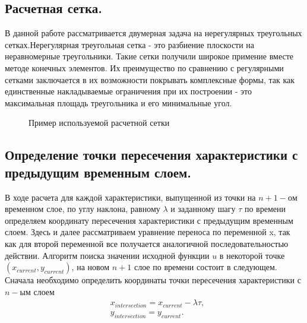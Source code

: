 \documentclass[14pt]{article}
\begin{document}
\subsection{Расчетная сетка.}
 В данной работе рассматривается двумерная задача на нерегулярных треугольных сетках.Нерегулярная треугольная сетка - это разбиение плоскости на неравномерные треугольники. Такие сетки получили широкое примение вместе методе конечных элементов. Их преимущество по сравнению с регулярными сетками заключается в их возможности покрывать комплексные формы, так как единственные накладываемые ограничения при их построении - это максимальная площадь треугольника и его минимальные угол.
\begin{figure}[!h]
\caption{Пример используемой расчетной сетки}
\end{figure}
\subsection{Определение точки пересечения характеристики с предыдущим временным слоем.}
В ходе расчета для каждой характеристики, выпущенной из точки на $n+1-ом$ временном слое, по углу наклона, равному $\lambda$ и заданному шагу $\tau$ по времени определяем координату пересечения характеристики с предыдущим временным слоем. Здесь и далее рассматриваем уравнение переноса по переменной x, так как для второй переменной все получается аналогичной последовательностью действии. Алгоритм поиска значении исходной функции $u$ в некоторой точке $(x_{current},y_{current})$, на новом $n+1$ слое по времени состоит в следующем.  Сначала необходимо определить координаты точки пересечения характеристики с $n-ым$ слоем
\begin{equation}
\begin{aligned}
&x_{intersection}=x_{current}- \lambda \tau,\\
&y_{intersection}=y_{current}.
\end{aligned}
\end{equation}
\end{document}
